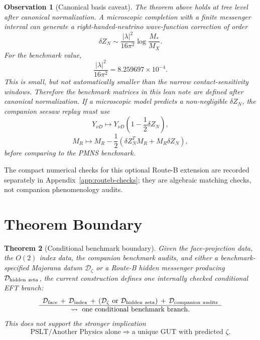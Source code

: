 \documentclass[
  aps,
  prd,
  preprint,
  nofootinbib,
  superscriptaddress,
  longbibliography
]{revtex4-2}
\newtheorem{theorem}{Theorem}[section]
\newtheorem{observation}[theorem]{Observation}
\begin{document}
\begin{observation}[Canonical basis caveat]
The theorem above holds at tree level after canonical normalization.  A
microscopic completion with a finite messenger interval can generate a
right-handed-neutrino wave-function correction of order
\[
  \delta Z_N\sim
  \frac{|\lambda|^2}{16\pi^2}
  \log\frac{M_*}{M_X}.
\]
For the benchmark value,
\[
  \frac{|\lambda|^2}{16\pi^2}
  =
  8.259697\times10^{-4}.
\]
This is small, but not automatically smaller than the narrow
contact-sensitivity windows.  Therefore the benchmark matrices in this lean
note are defined after canonical normalization.  If a microscopic model
predicts a non-negligible \(\delta Z_N\), the companion seesaw replay must use
\[
  Y_{\nu D}\mapsto Y_{\nu D}\left(1-\frac12\delta Z_N\right),
\]
\[
  M_R\mapsto
  M_R-\frac12\left(\delta Z_N^T M_R+M_R\delta Z_N\right),
\]
before comparing to the PMNS benchmark.
\end{observation}

The compact numerical checks for this optional Route-B extension are recorded
separately in Appendix~\ref{app:routeb-checks}; they are algebraic matching
checks, not companion phenomenology audits.

\section{Theorem Boundary}

\begin{theorem}[Conditional benchmark boundary]
Given the face-projection data, the \(O(2)\) index data, the companion
benchmark audits, and either a benchmark-specified Majorana datum
\(\mathcal D_\zeta\) or a Route-B hidden messenger producing
\(\mathcal D_{\rm hidden\ zeta}\), the current construction defines one
internally checked conditional EFT branch:
\[
\begin{array}{c}
\mathcal D_{\rm face}
\, +\, \mathcal D_{\rm index}
\, +\, (\mathcal D_{\zeta}\ \text{or}\ \mathcal D_{\rm hidden\ zeta})
\, +\, \mathcal D_{\mathrm{companion\ audits}}\\
\hline
\leadsto\ \text{one conditional benchmark branch}.
\end{array}
\]
This does not support the stronger implication
\[
  \text{PSLT/Another Physics alone}
  \Longrightarrow
  \text{a unique GUT with predicted }\zeta .
\]
\end{theorem}
\end{document}
